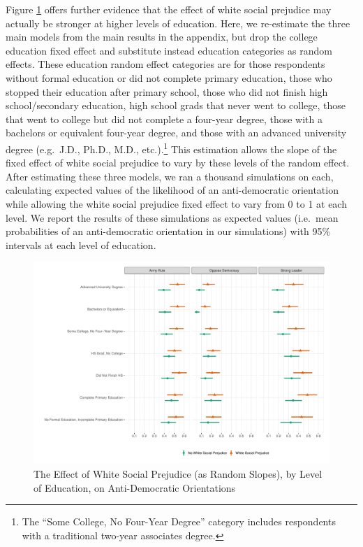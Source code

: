 \documentclass[11pt,]{article}
\begin{document}
Figure \ref{fig:randomslopesplot} offers further evidence that the
effect of white social prejudice may actually be stronger at higher
levels of education. Here, we re-estimate the three main models from the
main results in the appendix, but drop the college education fixed
effect and substitute instead education categories as random effects.
These education random effect categories are for those respondents
without formal education or did not complete primary education, those
who stopped their education after primary school, those who did not
finish high school/secondary education, high school grads that never
went to college, those that went to college but did not complete a
four-year degree, those with a bachelors or equivalent four-year degree,
and those with an advanced university degree (e.g.~J.D., Ph.D., M.D.,
etc.).\footnote{The ``Some College, No Four-Year Degree'' category
  includes respondents with a traditional two-year associates degree.}
This estimation allows the slope of the fixed effect of white social
prejudice to vary by these levels of the random effect. After estimating
these three models, we ran a thousand simulations on each, calculating
expected values of the likelihood of an anti-democratic orientation
while allowing the white social prejudice fixed effect to vary from 0 to
1 at each level. We report the results of these simulations as expected
values (i.e.~mean probabilities of an anti-democratic orientation in our
simulations) with 95\% intervals at each level of education.

\begin{figure}
\centering
\includegraphics{figs/educ_randomslopesplot.pdf}
\caption{\label{fig:randomslopesplot}The Effect of White Social
Prejudice (as Random Slopes), by Level of Education, on Anti-Democratic
Orientations}
\end{figure}
\end{document}
